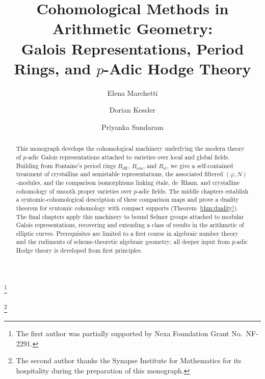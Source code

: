 \documentclass[10pt]{amsbook}
\theoremstyle{definition}
\theoremstyle{remark}
\begin{document}
\title[Cohomological Methods in Arithmetic Geometry]
{Cohomological Methods in Arithmetic Geometry: \\
 Galois Representations, Period Rings, and $p$-Adic Hodge Theory}

\author{Elena Marchetti}
\address{Department of Mathematics, Vertex Institute for Advanced Study, Meridian, MA 02139}
\curraddr{}
\thanks{The first author was partially supported by Nexa Foundation Grant No.\ NF-2291.}

\author{Dorian Kessler}
\address{School of Mathematical Sciences, Nimbus University, Apex Falls, CA 94301}
\thanks{The second author thanks the Synapse Institute for Mathematics for its hospitality
  during the preparation of this monograph.}

\author{Priyanka Sundaram}
\address{Institute for Pure and Applied Mathematics, Meridian College, Meridian, MA 02138}

\date{}




\begin{abstract}
This monograph develops the cohomological machinery underlying the modern theory of
$p$-adic Galois representations attached to varieties over local and global fields. Building
from Fontaine's period rings $B_{\mathrm{dR}}$, $B_{\mathrm{cris}}$, and $B_{\mathrm{st}}$, we
give a self-contained treatment of crystalline and semistable representations, the associated
filtered $(\varphi, N)$-modules, and the comparison isomorphisms linking étale, de~Rham, and
crystalline cohomology of smooth proper varieties over $p$-adic fields. The middle chapters
establish a syntomic-cohomological description of these comparison maps and prove a
duality theorem for syntomic cohomology with compact supports (Theorem~\ref{thm:duality}).
The final chapters apply this machinery to bound Selmer groups attached to modular Galois
representations, recovering and extending a class of results in the arithmetic of elliptic
curves. Prerequisites are limited to a first course in algebraic number theory and the
rudiments of scheme-theoretic algebraic geometry; all deeper input from $p$-adic Hodge theory
is developed from first principles.
\end{abstract}
\end{document}
